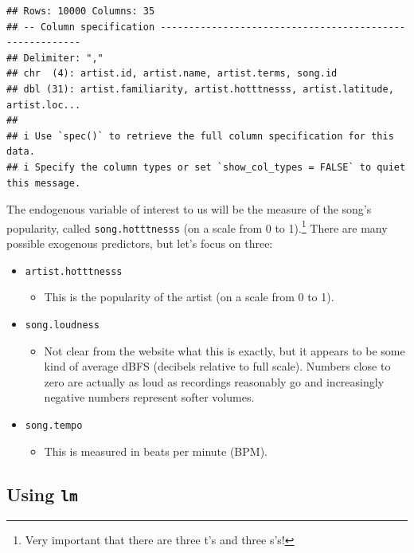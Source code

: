 \documentclass[
]{book}
\providecommand{\tightlist}{%
  \setlength{\itemsep}{0pt}\setlength{\parskip}{0pt}}
\begin{document}
\begin{verbatim}
## Rows: 10000 Columns: 35
## -- Column specification --------------------------------------------------------
## Delimiter: ","
## chr  (4): artist.id, artist.name, artist.terms, song.id
## dbl (31): artist.familiarity, artist.hotttnesss, artist.latitude, artist.loc...
## 
## i Use `spec()` to retrieve the full column specification for this data.
## i Specify the column types or set `show_col_types = FALSE` to quiet this message.
\end{verbatim}

The endogenous variable of interest to us will be the measure of the song's popularity, called \texttt{song.hotttnesss} (on a scale from 0 to 1).\footnote{Very important that there are three t's and three s's!} There are many possible exogenous predictors, but let's focus on three:

\begin{itemize}
\tightlist
\item
  \texttt{artist.hotttnesss}

  \begin{itemize}
  \tightlist
  \item
    This is the popularity of the artist (on a scale from 0 to 1).
  \end{itemize}
\item
  \texttt{song.loudness}

  \begin{itemize}
  \tightlist
  \item
    Not clear from the website what this is exactly, but it appears to be some kind of average dBFS (decibels relative to full scale). Numbers close to zero are actually as loud as recordings reasonably go and increasingly negative numbers represent softer volumes.
  \end{itemize}
\item
  \texttt{song.tempo}

  \begin{itemize}
  \tightlist
  \item
    This is measured in beats per minute (BPM).
  \end{itemize}
\end{itemize}

\hypertarget{multiple-r-lm}{%
\subsection{\texorpdfstring{Using \texttt{lm}}{Using lm}}\label{multiple-r-lm}}
\end{document}

